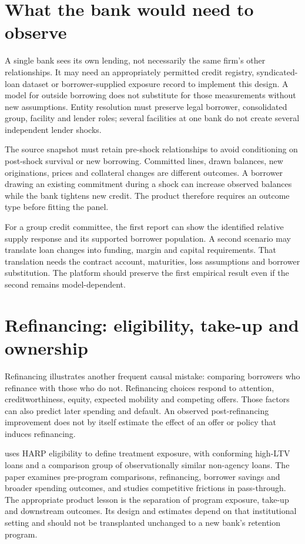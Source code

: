 \section{What the bank would need to observe}
A single bank sees its own lending, not necessarily the same firm's other
relationships. It may need an appropriately permitted credit registry,
syndicated-loan dataset or borrower-supplied exposure record to implement
this design. A model for outside borrowing does not substitute for those
measurements without new assumptions. Entity resolution must preserve
legal borrower, consolidated group, facility and lender roles; several
facilities at one bank do not create several independent lender shocks.

The source snapshot must retain pre-shock relationships to avoid conditioning
on post-shock survival or new borrowing. Committed lines, drawn balances,
new originations, prices and collateral changes are different outcomes.
A borrower drawing an existing commitment during a shock can increase
observed balances while the bank tightens new credit. The product therefore
requires an outcome type before fitting the panel.

For a group credit committee, the first report can show the identified
relative supply response and its supported borrower population. A second
scenario may translate loan changes into funding, margin and capital
requirements. That translation needs the contract account, maturities,
loss assumptions and borrower substitution. The platform should preserve
the first empirical result even if the second remains model-dependent.

\section{Refinancing: eligibility, take-up and ownership}
Refinancing illustrates another frequent causal mistake: comparing borrowers
who refinance with those who do not. Refinancing choices respond to
attention, creditworthiness, equity, expected mobility and competing offers.
Those factors can also predict later spending and default. An observed
post-refinancing improvement does not by itself estimate the effect of
an offer or policy that induces refinancing.

\citet{agarwal2020} uses HARP eligibility to define treatment exposure,
with conforming high-LTV loans and a comparison group of observationally
similar non-agency loans. The paper examines pre-program comparisons,
refinancing, borrower savings and broader spending outcomes, and studies
competitive frictions in pass-through. The appropriate product lesson is
the separation of program exposure, take-up and downstream outcomes. Its
design and estimates depend on that institutional setting and should not
be transplanted unchanged to a new bank's retention program.

